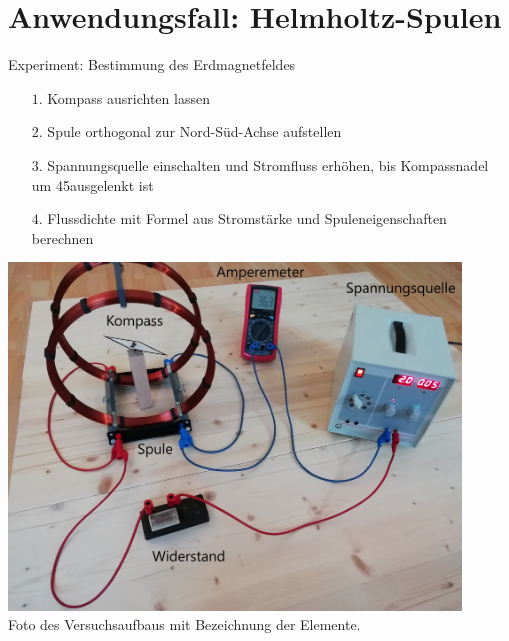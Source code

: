 \part{Anwendungsfall: Helmholtz-Spulen}
\label{part:physics}
\begin{frame}[fragile]{Experiment: Bestimmung des Erdmagnetfeldes}
\begin{minipage}{0.5\textwidth}
	{
\begin{itemize}[itemsep=1mm]
	\item[$1.$] Kompass ausrichten lassen
	\item[$2.$] Spule orthogonal zur Nord-Süd-Achse aufstellen
	\item[$3.$] Spannungsquelle einschalten und Stromfluss erhöhen, bis Kompassnadel um 45\degree ausgelenkt ist
	\item[$4.$] Flussdichte mit Formel aus Stromstärke und Spuleneigenschaften berechnen
\end{itemize}
}
\end{minipage}
\begin{minipage}{0.45\textwidth}
	\centering
	\includegraphics[width=0.9\textwidth]{images/papers/setup_labled.jpg}\\
	\small Foto des Versuchsaufbaus mit Bezeichnung der Elemente.
\end{minipage}
\end{frame}

